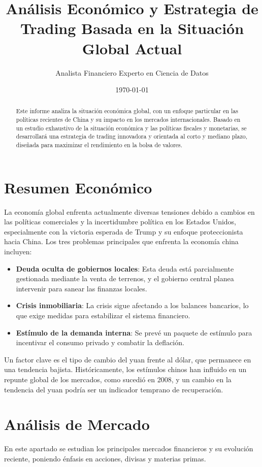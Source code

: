 \documentclass{article}
\title{Análisis Económico y Estrategia de Trading Basada en la Situación Global Actual}
\author{Analista Financiero Experto en Ciencia de Datos}
\date{\today}
\begin{document}
\maketitle

\begin{abstract}
Este informe analiza la situación económica global, con un enfoque particular en las políticas recientes de China y su impacto en los mercados internacionales. Basado en un estudio exhaustivo de la situación económica y las políticas fiscales y monetarias, se desarrollará una estrategia de trading innovadora y orientada al corto y mediano plazo, diseñada para maximizar el rendimiento en la bolsa de valores.
\end{abstract}

\section{Resumen Económico}
La economía global enfrenta actualmente diversas tensiones debido a cambios en las políticas comerciales y la incertidumbre política en los Estados Unidos, especialmente con la victoria esperada de Trump y su enfoque proteccionista hacia China. Los tres problemas principales que enfrenta la economía china incluyen:

\begin{itemize}
    \item \textbf{Deuda oculta de gobiernos locales}: Esta deuda está parcialmente gestionada mediante la venta de terrenos, y el gobierno central planea intervenir para sanear las finanzas locales.
    \item \textbf{Crisis inmobiliaria}: La crisis sigue afectando a los balances bancarios, lo que exige medidas para estabilizar el sistema financiero.
    \item \textbf{Estímulo de la demanda interna}: Se prevé un paquete de estímulo para incentivar el consumo privado y combatir la deflación.
\end{itemize}

Un factor clave es el tipo de cambio del yuan frente al dólar, que permanece en una tendencia bajista. Históricamente, los estímulos chinos han influido en un repunte global de los mercados, como sucedió en 2008, y un cambio en la tendencia del yuan podría ser un indicador temprano de recuperación.

\section{Análisis de Mercado}
En este apartado se estudian los principales mercados financieros y su evolución reciente, poniendo énfasis en acciones, divisas y materias primas.
\end{document}
